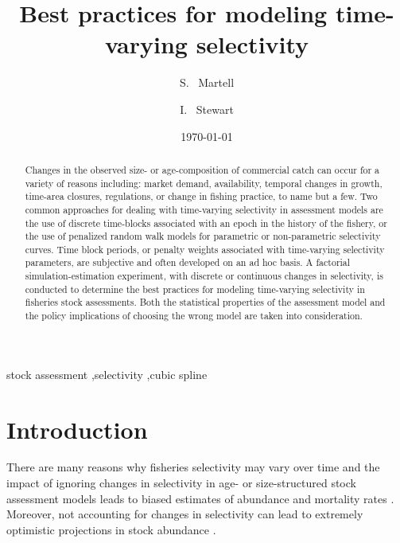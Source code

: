 \documentclass[review,letterpaper,10pt,authoryear]{elsarticle}
\title{Best practices for modeling time-varying selectivity}
\author[sm]{S. ~Martell\corref{cor1}}
\author[is]{I. ~Stewart}
\date{\today}
\begin{document}
	\linenumbers


	
	
	
	\begin{abstract}

    Changes in the observed size- or age-composition of commercial catch can occur for a variety of reasons including: market demand, availability, temporal changes in growth, time-area closures, regulations, or change in fishing practice, to name but a few.  Two common approaches for dealing with time-varying selectivity in assessment models are the use of discrete time-blocks associated with an epoch in the history of the fishery, or the use of penalized random walk models for parametric or non-parametric selectivity curves.  Time block periods, or penalty weights associated with time-varying selectivity parameters, are subjective and often developed on an ad hoc basis. A factorial simulation-estimation experiment, with discrete or continuous changes in selectivity, is conducted to determine the best practices for modeling time-varying selectivity in fisheries stock assessments. Both the statistical properties of the assessment model and the policy implications of choosing the wrong model are taken into consideration.

	\end{abstract}
	\begin{keyword}
		stock assessment \sep selectivity \sep cubic spline		
	\end{keyword}


	\maketitle
	
	\section*{Introduction} %
\label{sec:introduction}
There are many reasons why fisheries selectivity may vary over time and the impact of ignoring changes in selectivity in age- or size-structured stock assessment models leads to biased estimates of abundance and mortality rates \citep[e.g.,][]{gudmundsson2012selection}.  Moreover, not accounting for changes in selectivity can lead to extremely optimistic projections in stock abundance \citep[e.g., 2J3KL cod stocks,][]{walters1996lessons}. 
\end{document}
